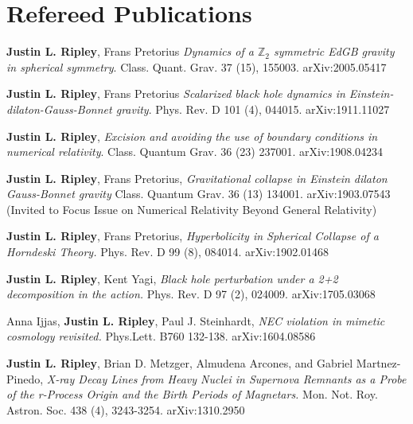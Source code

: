 \documentclass{my_cv}
\begin{document}
\section{Refereed Publications}
\begin{etaremune}
\item {\bf Justin L. Ripley}, Frans Pretorius 
	\emph{Dynamics of a $\mathbb{Z}_2$ symmetric EdGB gravity in
	spherical symmetry}.
	Class. Quant. Grav. 37 (15), 155003.
	arXiv:2005.05417
\item {\bf Justin L. Ripley}, Frans Pretorius 
	\emph{Scalarized black hole dynamics in
	Einstein-dilaton-Gauss-Bonnet gravity}.
	Phys. Rev. D 101 (4), 044015.
	arXiv:1911.11027
\item {\bf Justin L. Ripley}, 
	\emph{Excision and avoiding the use of boundary conditions
	in numerical relativity}.
	Class. Quantum Grav. 36 (23) 237001.  
	arXiv:1908.04234
\item {\bf Justin L. Ripley}, Frans Pretorius, 
	\emph{Gravitational collapse in Einstein
	dilaton Gauss-Bonnet gravity}
	Class. Quantum Grav. 36 (13) 134001. arXiv:1903.07543
	(Invited to Focus Issue on Numerical
	Relativity Beyond General Relativity)
\item {\bf Justin L. Ripley}, Frans Pretorius, 
	\emph{Hyperbolicity in Spherical Collapse of a Horndeski Theory.}
	Phys. Rev. D 99 (8), 084014. arXiv:1902.01468
\item {\bf Justin L. Ripley}, Kent Yagi, 
	\emph{Black hole perturbation under a 2+2 decomposition
	in the action.}
	Phys. Rev. D 97 (2), 024009. arXiv:1705.03068
\item Anna Ijjas, {\bf Justin L. Ripley}, Paul J. Steinhardt,
	\emph{NEC violation in mimetic cosmology revisited.}
	Phys.Lett. B760 132-138. arXiv:1604.08586
\item {\bf Justin L. Ripley}, Brian D. Metzger,	
	Almudena Arcones, and Gabriel Martnez-Pinedo,
	\emph{X-ray Decay Lines from Heavy Nuclei in
	Supernova Remnants as a Probe of the r-Process Origin
	and the Birth Periods of Magnetars.}
	Mon. Not. Roy. Astron. Soc. 438 (4), 3243-3254.
	arXiv:1310.2950
\end{etaremune}
\end{document}
